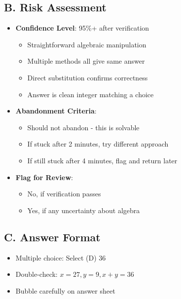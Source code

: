 \documentclass[12pt]{article}
\begin{document}
\begin{competitionbox}
\subsection*{B. Risk Assessment}
\begin{itemize}[leftmargin=*]
    \item \textbf{Confidence Level}: 95\%+ after verification
    \begin{itemize}
        \item Straightforward algebraic manipulation
        \item Multiple methods all give same answer
        \item Direct substitution confirms correctness
        \item Answer is clean integer matching a choice
    \end{itemize}
    \item \textbf{Abandonment Criteria}: 
    \begin{itemize}
        \item Should not abandon - this is solvable
        \item If stuck after 2 minutes, try different approach
        \item If still stuck after 4 minutes, flag and return later
    \end{itemize}
    \item \textbf{Flag for Review}: 
    \begin{itemize}
        \item No, if verification passes
        \item Yes, if any uncertainty about algebra
    \end{itemize}
\end{itemize}

\subsection*{C. Answer Format}
\begin{itemize}[leftmargin=*]
    \item Multiple choice: Select (D) 36
    \item Double-check: $x = 27, y = 9, x+y = 36$ \checkmark
    \item Bubble carefully on answer sheet
\end{itemize}
\end{competitionbox}
\end{document}
